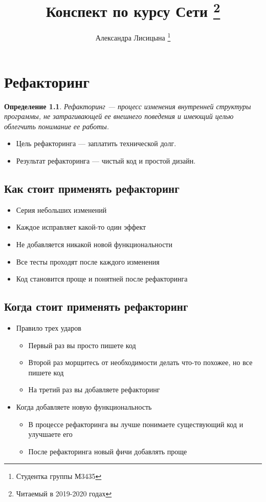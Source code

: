 \documentclass[10pt,a4paper,oneside,titlepage]{report}
\title{Конспект по курсу Сети \thanks{Читаемый  в 2019-2020 годах}}
\author{Александра Лисицына \thanks{Студентка группы М3435}}
\theoremstyle{defenition}
\newtheorem*{defenition}{Определение}
\begin{document}
\maketitle

\tableofcontents

\clearpage	

\chapter{Рефакторинг}

\begin{defenition}
	Рефакторинг --- процесс изменения внутренней структуры программы, не затрагивающей ее внешнего поведения и имеющий целью облегчить понимание ее работы.
\end{defenition}

\begin{itemize}
	\item Цель рефакторинга --- заплатить технической долг.
	\item Результат рефакторинга --- чистый код и простой дизайн.
\end{itemize}

\section{Как стоит применять рефакторинг}

\begin{itemize}
	\item Серия небольших изменений
	\item Каждое исправляет какой-то один эффект
	\item Не добавляется никакой новой функциональности
	\item Все тесты проходят после каждого изменения
	\item Код становится проще и понятней после рефакторинга
\end{itemize}

\section{Когда стоит применять рефакторинг}

\begin{itemize}
	\item Правило трех ударов
	\begin{itemize}
		\item Первый раз вы просто пишете код
		\item Второй раз морщитесь от необходимости делать что-то похожее, но все пишете код
		\item На третий раз вы добавляете рефакторинг 
	\end{itemize}
    \item Когда добавляете новую функциональность
    \begin{itemize}
    	\item В процессе рефакторинга вы лучше понимаете существующий код и улучшаете его
    	\item После рефакторинга новый фичи добавлять проще
    \end{itemize}
\end{itemize}
\end{document}
